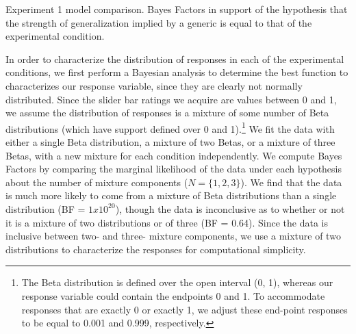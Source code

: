 \documentclass[10pt,letterpaper]{article}
\begin{document}
\begin{center}
  \begin{table}[h]
    \centering
    \caption{Experiment 1 model comparison. Bayes Factors in support of the hypothesis that the strength of generalization implied by a generic is equal to that of the experimental condition.}
    \label{tab:nobsBF}
  \end{table}
\end{center}

In order to characterize the distribution of responses in each of the experimental conditions, we first perform a Bayesian analysis to determine the best function to characterizes our response variable, since they are clearly not normally distributed.
Since the slider bar ratings we acquire are values between 0 and 1, we assume the distribution of responses is a mixture of some number of Beta distributions (which have support defined over 0 and 1).\footnote{The Beta distribution is defined over the open interval (0, 1), whereas our response variable could contain the endpoints 0 and 1. To accommodate responses that are exactly 0 or exactly 1, we adjust these end-point responses to be equal to 0.001 and 0.999, respectively.}
We fit the data with either a single Beta distribution, a mixture of two Betas, or a mixture of three Betas, with a new mixture for each condition independently.%
We compute Bayes Factors by comparing the marginal likelihood of the data under each hypothesis about the number of mixture components ($N = \{1, 2, 3\}$).
We find that the data is much more likely to come from a mixture of Beta distributions than a single distribution (BF = $1x10^20$), though the data is inconclusive as to whether or not it is a mixture of two distributions or of three (BF = 0.64).%
Since the data is inclusive between two- and three- mixture components, we use a mixture of two distributions to characterize the responses for computational simplicity. 
\end{document}
